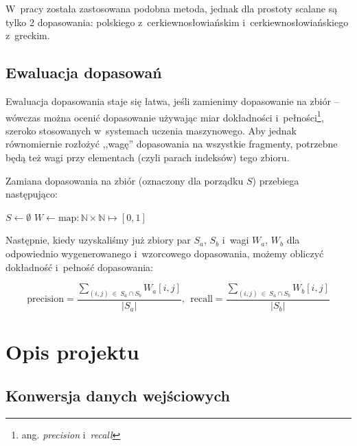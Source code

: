 \documentclass{pracamgr}
\begin{document}
W~pracy została zastosowana podobna metoda, jednak dla prostoty
scalane są tylko 2 dopasowania: polskiego z~cerkiewno\-{}słowiańskim
i~cerkiewno\-{}słowiańskiego z~greckim.

\pagebreak

\section{Ewaluacja dopasowań}

Ewaluacja dopasowania staje się łatwa, jeśli zamienimy dopasowanie na
zbiór -- wówczas można ocenić dopasowanie używając miar dokładności
i~pełności\footnote{ang. \textit{precision} i~\textit{recall}},
szeroko stosowanych w~systemach uczenia maszynowego. Aby jednak
równomiernie rozłożyć ,,wagę'' dopasowania na wszystkie fragmenty,
potrzebne będą też wagi przy elementach (czyli parach indeksów) tego
zbioru.

Zamiana dopasowania na zbiór (oznaczony dla porządku $S$) przebiega
następująco:

\begin{algorithm}[H]
  $S \leftarrow \emptyset$ \;
  $W \leftarrow \mbox{map} : \mathbb{N} \times \mathbb{N} \mapsto [0, 1]$ \;
\end{algorithm}

Następnie, kiedy uzyskaliśmy już zbiory par $S_a$, $S_b$ i~wagi $W_a$,
$W_b$ dla odpowiednio wygenero\-{}wanego i~wzorcowego dopasowania, możemy
obliczyć dokładność i~pełność dopasowania:

$$
\mbox{precision} = \frac{\sum_{(i, j)\:\in\:S_a \cap S_b} W_a[i, j]}{|S_a|},\:\:
\mbox{recall}    = \frac{\sum_{(i, j)\:\in\:S_a \cap S_b} W_b[i, j]}{|S_b|}
$$



\chapter{Opis projektu}\label{r:opis}

\section{Konwersja danych wejściowych}
\end{document}
